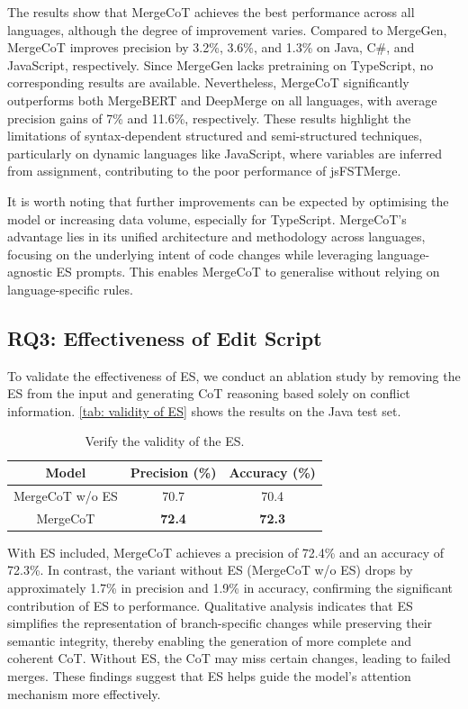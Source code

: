 \documentclass[sigconf,review,anonymous]{acmart}
\begin{document}
The results show that MergeCoT achieves the best performance across all languages, although the degree of improvement varies. Compared to MergeGen, MergeCoT improves precision by 3.2\%, 3.6\%, and 1.3\% on Java, C\#, and JavaScript, respectively. Since MergeGen lacks pretraining on TypeScript, no corresponding results are available. Nevertheless, MergeCoT significantly outperforms both MergeBERT and DeepMerge on all languages, with average precision gains of 7\% and 11.6\%, respectively. These results highlight the limitations of syntax-dependent structured and semi-structured techniques, particularly on dynamic languages like JavaScript, where variables are inferred from assignment, contributing to the poor performance of jsFSTMerge.

It is worth noting that further improvements can be expected by optimising the model or increasing data volume, especially for TypeScript. MergeCoT’s advantage lies in its unified architecture and methodology across languages, focusing on the underlying intent of code changes while leveraging language-agnostic ES prompts. This enables MergeCoT to generalise without relying on language-specific rules.

\subsection{RQ3: Effectiveness of Edit Script}
To validate the effectiveness of ES, we conduct an ablation study by removing the ES from the input and generating CoT reasoning based solely on conflict information. \autoref{tab: validity of ES} shows the results on the Java test set.

\begin{table}[H]
\caption{Verify the validity of the ES.}
\begin{tabular}{ccc}
\hline
Model           & Precision (\%) & Accuracy (\%) \\ \hline
MergeCoT w/o ES & 70.7           & 70.4          \\
MergeCoT        & \textbf{72.4}  & \textbf{72.3}   \\ \hline
\end{tabular}
\label{tab: validity of ES}
\end{table}

With ES included, MergeCoT achieves a precision of 72.4\% and an accuracy of 72.3\%. In contrast, the variant without ES (MergeCoT w/o ES) drops by approximately 1.7\% in precision and 1.9\% in accuracy, confirming the significant contribution of ES to performance. Qualitative analysis indicates that ES simplifies the representation of branch-specific changes while preserving their semantic integrity, thereby enabling the generation of more complete and coherent CoT. Without ES, the CoT may miss certain changes, leading to failed merges. These findings suggest that ES helps guide the model’s attention mechanism more effectively.
\end{document}
